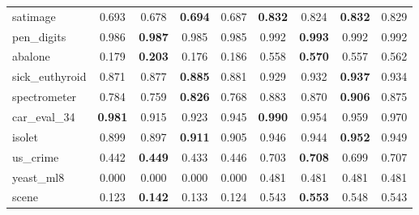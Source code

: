 \begin{figure}[ht]
\begin{tabular}{p{22mm}|*4{p{14mm}}|*4{p{14mm}}}
        satimage&\multicolumn{1}{c}{0.693}&\multicolumn{1}{c}{0.678}&\multicolumn{1}{c}{\textbf{0.694}}&\multicolumn{1}{c|}{0.687}&\multicolumn{1}{c}{\textbf{0.832}}&\multicolumn{1}{c}{0.824}&\multicolumn{1}{c}{\textbf{0.832}}&\multicolumn{1}{c}{0.829}\\
        pen\_digits&\multicolumn{1}{c}{0.986}&\multicolumn{1}{c}{\textbf{0.987}}&\multicolumn{1}{c}{0.985}&\multicolumn{1}{c|}{0.985}&\multicolumn{1}{c}{0.992}&\multicolumn{1}{c}{\textbf{0.993}}&\multicolumn{1}{c}{0.992}&\multicolumn{1}{c}{0.992}\\
        abalone&\multicolumn{1}{c}{0.179}&\multicolumn{1}{c}{\textbf{0.203}}&\multicolumn{1}{c}{0.176}&\multicolumn{1}{c|}{0.186}&\multicolumn{1}{c}{0.558}&\multicolumn{1}{c}{\textbf{0.570}}&\multicolumn{1}{c}{0.557}&\multicolumn{1}{c}{0.562}\\
        sick\_euthyroid&\multicolumn{1}{c}{0.871}&\multicolumn{1}{c}{0.877}&\multicolumn{1}{c}{\textbf{0.885}}&\multicolumn{1}{c|}{0.881}&\multicolumn{1}{c}{0.929}&\multicolumn{1}{c}{0.932}&\multicolumn{1}{c}{\textbf{0.937}}&\multicolumn{1}{c}{0.934}\\
        spectrometer&\multicolumn{1}{c}{0.784}&\multicolumn{1}{c}{0.759}&\multicolumn{1}{c}{\textbf{0.826}}&\multicolumn{1}{c|}{0.768}&\multicolumn{1}{c}{0.883}&\multicolumn{1}{c}{0.870}&\multicolumn{1}{c}{\textbf{0.906}}&\multicolumn{1}{c}{0.875}\\
        car\_eval\_34&\multicolumn{1}{c}{\textbf{0.981}}&\multicolumn{1}{c}{0.915}&\multicolumn{1}{c}{0.923}&\multicolumn{1}{c|}{0.945}&\multicolumn{1}{c}{\textbf{0.990}}&\multicolumn{1}{c}{0.954}&\multicolumn{1}{c}{0.959}&\multicolumn{1}{c}{0.970}\\
        isolet&\multicolumn{1}{c}{0.899}&\multicolumn{1}{c}{0.897}&\multicolumn{1}{c}{\textbf{0.911}}&\multicolumn{1}{c|}{0.905}&\multicolumn{1}{c}{0.946}&\multicolumn{1}{c}{0.944}&\multicolumn{1}{c}{\textbf{0.952}}&\multicolumn{1}{c}{0.949}\\
        us\_crime&\multicolumn{1}{c}{0.442}&\multicolumn{1}{c}{\textbf{0.449}}&\multicolumn{1}{c}{0.433}&\multicolumn{1}{c|}{0.446}&\multicolumn{1}{c}{0.703}&\multicolumn{1}{c}{\textbf{0.708}}&\multicolumn{1}{c}{0.699}&\multicolumn{1}{c}{0.707}\\
        yeast\_ml8&\multicolumn{1}{c}{0.000}&\multicolumn{1}{c}{0.000}&\multicolumn{1}{c}{0.000}&\multicolumn{1}{c|}{0.000}&\multicolumn{1}{c}{0.481}&\multicolumn{1}{c}{0.481}&\multicolumn{1}{c}{0.481}&\multicolumn{1}{c}{0.481}\\
        scene&\multicolumn{1}{c}{0.123}&\multicolumn{1}{c}{\textbf{0.142}}&\multicolumn{1}{c}{0.133}&\multicolumn{1}{c|}{0.124}&\multicolumn{1}{c}{0.543}&\multicolumn{1}{c}{\textbf{0.553}}&\multicolumn{1}{c}{0.548}&\multicolumn{1}{c}{0.543}\\

\end{tabular}
\end{figure}
